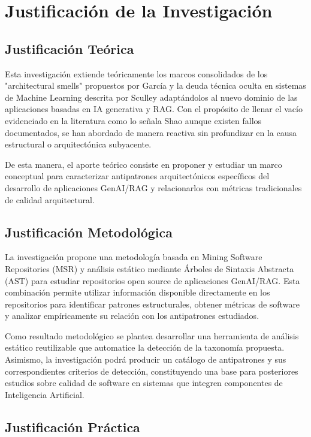 \section{Justificación de la Investigación}
 
\subsection{Justificación Teórica}
 Esta investigación extiende teóricamente los marcos consolidados de los "architectural smells" propuestos por García  \cite{garcia_identifying_2009} y la deuda técnica oculta en sistemas de Machine Learning descrita por Sculley \cite{sculley_hidden_2015} adaptándolos al nuevo dominio de las aplicaciones basadas en IA generativa y RAG. Con el propósito de llenar el vacío evidenciado en la literatura como lo señala Shao \cite{shao_are_2024} aunque existen fallos documentados, se han abordado de manera reactiva sin profundizar en la causa estructural o arquitectónica subyacente.

De esta manera, el aporte teórico consiste en proponer y estudiar un marco conceptual para caracterizar antipatrones arquitectónicos específicos del desarrollo de aplicaciones GenAI/RAG y relacionarlos con métricas tradicionales de calidad arquitectural.
 
\subsection{Justificación Metodológica}
 
La investigación propone una metodología basada en Mining Software Repositories (MSR) y análisis estático mediante Árboles de Sintaxis Abstracta (AST) para estudiar repositorios open source de aplicaciones GenAI/RAG. Esta combinación permite utilizar información disponible directamente en los repositorios para identificar patrones estructurales, obtener métricas de software y analizar empíricamente su relación con los antipatrones estudiados.

Como resultado metodológico se plantea desarrollar una herramienta de análisis estático reutilizable que automatice la detección de la taxonomía propuesta. Asimismo, la investigación podrá producir un catálogo de antipatrones y sus correspondientes criterios de detección, constituyendo una base para posteriores estudios sobre calidad de software en sistemas que integren componentes de Inteligencia Artificial. 

\subsection{Justificación Práctica}
 
